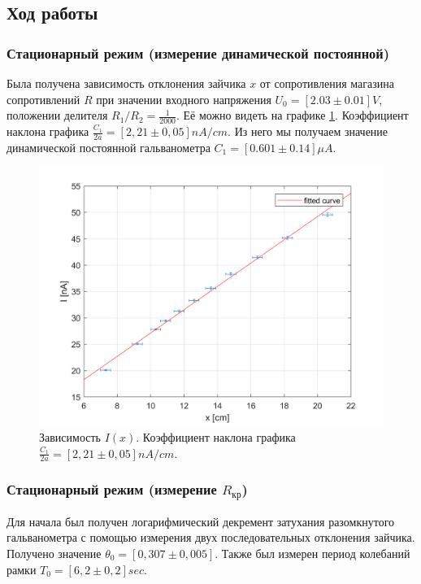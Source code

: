 \documentclass[a4paper,12pt]{article}
\begin{document}
\bigskip

\subsection*{Ход работы}
\bigskip

\subsubsection*{Стационарный режим (измерение динамической постоянной)}

Была получена зависимость отклонения зайчика $x$ от сопротивления магазина сопротивлений $R$ при значении входного напряжения $U_0 = [2.03 \pm 0.01] V$, положении делителя $R_1/R_2 = \frac{1}{2000}$. Её можно видеть на графике \ref{PlotA}. Коэффициент наклона графика $\frac{C_1}{2a} = [2,21 \pm 0,05]nA/cm$. Из него мы получаем значение динамической постоянной гальванометра $C_1 = [0.601 \pm 0.14] \mu A$.

   \begin{figure}[h!]
   \centering
   \includegraphics[width=12cm]{PlotA.png} 
   \caption{Зависимость $I(x)$. Коэффициент наклона графика $\frac{C_1}{2a} = [2,21 \pm 0,05]nA/cm$.} 
   \label{PlotA} 
   \end{figure}

\subsubsection*{Стационарный режим (измерение $R_\text{кр}$)}

Для начала был получен логарифмический декремент затухания разомкнутого гальванометра с помощью измерения двух последовательных отклонения зайчика. Получено значение $\theta_0 = [0,307 \pm 0,005]$. Также был измерен период колебаний рамки $T_0 = [6,2 \pm 0,2]sec$.  
\end{document}
